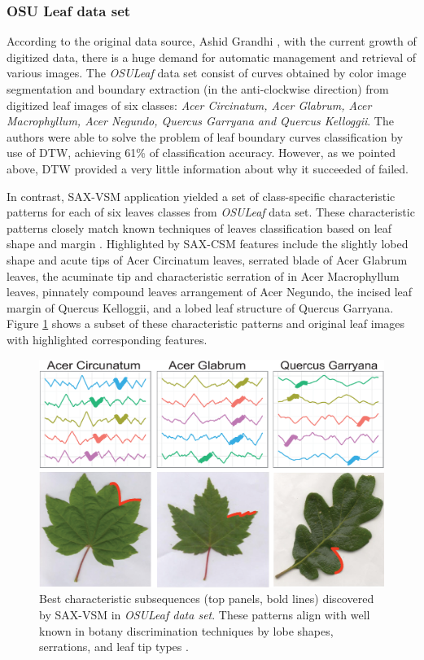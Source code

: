 \subsubsection{OSU Leaf data set}
According to the original data source, Ashid Grandhi \cite{citeulike:12563798}, with the current growth of
digitized data, there is a huge demand for automatic management and retrieval of various images. The
\textit{OSULeaf} data set consist of curves obtained by color image segmentation and boundary
extraction (in the anti-clockwise direction) from digitized leaf images of six classes: \textit{Acer
Circinatum, Acer Glabrum, Acer Macrophyllum, Acer Negundo, Quercus Garryana and Quercus Kelloggii}.
The authors were able to solve the problem of leaf boundary curves classification by use of DTW, 
achieving 61\% of classification accuracy. However, as we pointed above, DTW provided a
very little information about why it succeeded of failed. 

In contrast, SAX-VSM application yielded a set of class-specific characteristic patterns for each of
six leaves classes from \textit{OSULeaf} data set. These characteristic patterns closely match
known techniques of leaves classification based on leaf shape and margin \cite{citeulike:12134192}. 
Highlighted by SAX-CSM features include the slightly lobed shape and acute tips of
Acer Circinatum leaves, serrated blade of Acer Glabrum leaves, the acuminate tip and characteristic
serration of in Acer Macrophyllum leaves, pinnately compound leaves arrangement of Acer Negundo, the
incised leaf margin of Quercus Kelloggii, and a lobed leaf structure of Quercus Garryana. 
Figure \ref{fig:shapelet-acer-patterns} shows a subset of these characteristic patterns and original
leaf images with highlighted corresponding features.

\begin{figure}[ht]
   \centering
   \includegraphics[width=120mm]{figures/AcerCircunatum.eps}
   \caption{Best characteristic subsequences (top panels, bold lines) discovered by SAX-VSM in
      \textit{OSULeaf data set}.
These patterns align with well known in botany discrimination techniques
by lobe shapes, serrations, and leaf tip types \cite{citeulike:12134192}.}
   \label{fig:shapelet-acer-patterns}
\end{figure}

